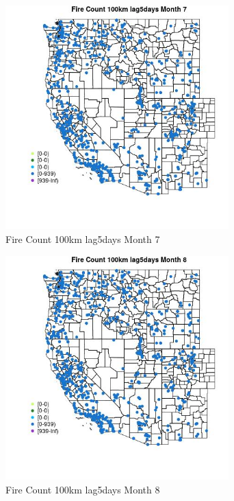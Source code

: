 \begin{figure} 
\centering  
\includegraphics[width=0.77\textwidth]{Code_Outputs/Report_ML_input_PM25_Step4_part_e_de_duplicated_aves_compiled_2019-05-21wNAs_MapObsMo7Fire_Count_100km_lag5days.jpg} 
\caption{\label{fig:Report_ML_input_PM25_Step4_part_e_de_duplicated_aves_compiled_2019-05-21wNAsMapObsMo7Fire_Count_100km_lag5days}Fire Count 100km lag5days Month 7} 
\end{figure} 
 

\begin{figure} 
\centering  
\includegraphics[width=0.77\textwidth]{Code_Outputs/Report_ML_input_PM25_Step4_part_e_de_duplicated_aves_compiled_2019-05-21wNAs_MapObsMo8Fire_Count_100km_lag5days.jpg} 
\caption{\label{fig:Report_ML_input_PM25_Step4_part_e_de_duplicated_aves_compiled_2019-05-21wNAsMapObsMo8Fire_Count_100km_lag5days}Fire Count 100km lag5days Month 8} 
\end{figure} 
 

